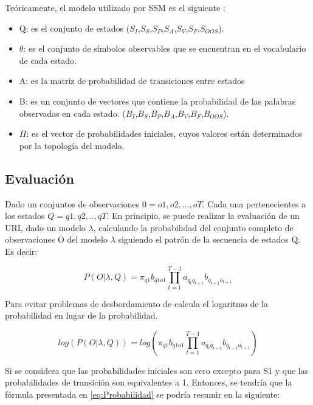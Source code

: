 Teóricamente, el modelo utilizado por SSM es el siguiente \cite{tesisMexico}:

\begin{itemize}
\item Q: es el conjunto de estados ($S_{I}$,$S_{S}$,$S_{P}$,$S_{A}$,$S_{V}$,$S_{F}$,$S_{OOS}$).
\item $\theta$: es el conjunto de s\'imbolos observables que se encuentran en el vocabulario de cada estado.
\item A: es la matriz de probabilidad de transiciones entre estados
\item B: es un conjunto de vectores que contiene la probabilidad de las palabras observadas en cada estado. ($B_{I}$,$B_{S}$,$B_{P}$,$B_{A}$,$B_{V}$,$B_{F}$,$B_{OOS}$).
\item $\Pi$: es el vector de probabilidades iniciales, cuyos valores est\'an determinados por la topolog\'ia del modelo. 
\end{itemize}

\subsection*{Evaluación}
\label{subsec:exprIndice}

Dado un conjuntos de observaciones $0 = o1,o2,...,oT$. Cada una pertenecientes a los estados $Q = q1,q2,..,qT$. En principio, se puede realizar la evaluación de un URI, dado un modelo $\lambda$,  calculando la probabilidad del conjunto completo de observaciones O del modelo $\lambda$ siguiendo el patrón de la secuencia de estados Q. Es decir:

\begin{equation}
P(O|\lambda,Q) = \pi_{q1}b_{q1o1}\prod_{t=1}^{T-1}a_{q_{t}q_{t+1}}b_{q_{t+1}o_{t+1}}
\end{equation}

Para evitar problemas de desbordamiento de calcula el logaritmo de la probabilidad en lugar de la probabilidad.

\begin{equation}\label{eq:Probabilidad}
log(P(O|\lambda,Q)) = log(\pi_{q1}b_{q1o1}\prod_{t=1}^{T-1}a_{q_{t}q_{t+1}}b_{q_{t+1}o_{t+1}})
\end{equation}

Si se considera que las probabilidades iniciales son cero excepto para S1 y que las probabilidades de transición son equivalentes a 1. Entonces, se tendría que la fórmula presentada en \ref{eq:Probabilidad} se podría resumir en la siguiente:


